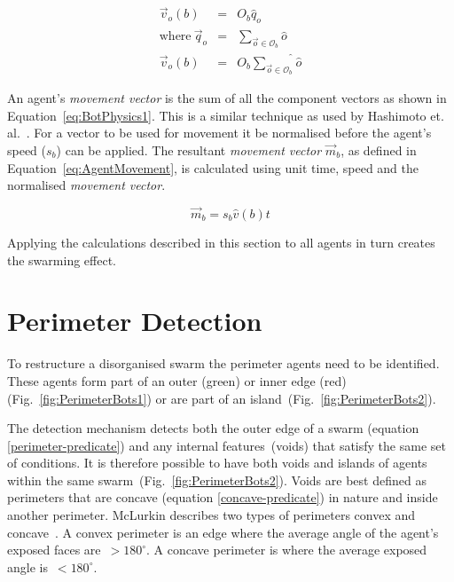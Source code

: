\documentclass{ieeeaccess}
\newcommand{\magn}[1]{\vert{#1}\vert}
\begin{document}

\begin{eqnarray}\label{eq:Obstacle2}
  \vec v_o(b) & = & O_b \hat q_o \\
	\mathrm{where~}  \vec q_o & = & \sum_{\vec o\in \mathcal O_b } \hat o
	\nonumber \\
	\vec v_o(b) & = & O_b \widehat{\sum_{\vec o\in \mathcal O_b }} \hat o \nonumber
\end{eqnarray}

An agent's \textit{movement vector} is the sum of all the component vectors as
shown in Equation~\ref{eq:BotPhysics1}. This is a similar technique as used by
Hashimoto et. al.~\cite{HAY:08}. For a vector to be used for movement it be
normalised before the agent's speed ($s_b$)  can be applied. The resultant
\textit{movement vector} $\vec m_b$, as defined in Equation~\ref{eq:AgentMovement}, is calculated using unit time, speed and the normalised \textit{movement vector}.

\begin{equation}\label{eq:AgentMovement}
\vec m_b = s_b  \hat v(b)  t
\end{equation}

Applying the calculations described in this section to all agents in turn creates the swarming effect. 
  
\section{Perimeter Detection}\label{sec:PerimeterDetection}
To restructure a disorganised swarm the perimeter agents need to be identified. These agents form part of an outer ({\color{green}green}) or inner edge ({\color{red}red}) (Fig.~\ref{fig:PerimeterBots1}) or are part of an island~(Fig.~\ref{fig:PerimeterBots2}).

The detection mechanism detects both the outer edge of a swarm (equation
\ref{perimeter-predicate})  and any internal features~(voids) that satisfy the same
set of conditions. It is therefore possible to have both voids and islands of
agents within the same swarm~(Fig.~\ref{fig:PerimeterBots2}). Voids are best
defined as perimeters that are concave (equation \ref{concave-predicate}) in nature and inside another perimeter. McLurkin describes two types of perimeters convex and concave~\cite{MD:09}. A convex perimeter is an edge where the average angle of the agent's exposed faces are~$> 180^\circ$. A concave perimeter is where the average exposed angle is~$< 180^\circ$.
\end{document}
